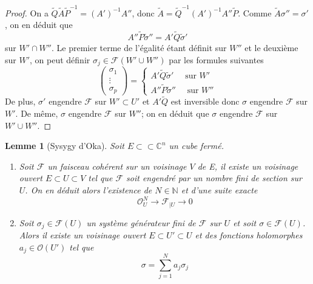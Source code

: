 \documentclass{article}
\newtheorem{lemme}[theoreme]{Lemme}
\theoremstyle{definition}
\theoremstyle{remark}
\begin{document}
\begin{proof}
On a $\tilde{Q}\tilde{A}\tilde{P}^{-1} = (A')^{-1}A''$, donc $\tilde{A} = \tilde{Q}^{-1}(A')^{-1}A''\tilde{P}$. Comme $\tilde{A}\sigma'' = \sigma'$, on en déduit que $$A''\tilde{P}\tilde{\sigma}''=A'\tilde{Q}\tilde{\sigma}'$$ sur $W' \cap W''$. Le premier terme de l'égalité étant définit sur $W''$ et le deuxième sur $W'$, on peut définir $\sigma_j \in \mathcal{F}(W'\cup W'')$ par les formules suivantes
\begin{equation*}
\begin{pmatrix}
   \sigma_1 \\ \vdots \\ \sigma_p
\end{pmatrix} = \left\{
\begin{array}{l}
  A'\tilde{Q}\tilde{\sigma}' \quad\text{ sur } W'\\
  A''\tilde{P}\tilde{\sigma}'' \quad\text{ sur } W''
\end{array}
\right.
\end{equation*}
De plus, $\sigma'$ engendre $\mathcal{F}$ sur $W' \subset U'$ et $A'\tilde{Q}$ est inversible donc $\sigma$ engendre $\mathcal{F}$ sur $W'$. De même, $\sigma$ engendre $\mathcal{F}$ sur $W''$; on en déduit que $\sigma$ engendre $\mathcal{F}$ sur $W'\cup W''$.
\end{proof}

\begin{lemme}[Sysygy d'Oka]
Soit $E \subset\subset \mathbb{C}^n$ un cube fermé.
\begin{enumerate}
\item Soit $\mathcal{F}$ un faisceau cohérent sur un voisinage $V$ de E, il existe un voisinage ouvert $E \subset U \subset V$ tel que $\mathcal{F}$ soit engendré par un nombre fini de section sur $U$. On en déduit alors l'existence de $N \in \mathbb{N}$ et d'une suite exacte $$\mathcal{O}^N_U \to \mathcal{F}_{|U} \to 0$$
\item Soit $\sigma_j \in \mathcal{F}(U)$ un système générateur fini de $\mathcal{F}$ sur $U$ et  soit $\sigma \in \mathcal{F}(U)$. Alors il existe un voisinage ouvert $E \subset U' \subset U$ et des fonctions holomorphes $a_j \in \mathcal{O}(U')$ tel que $$\sigma = \sum_{j=1}^N a_j\sigma_j$$
\end{enumerate}
\end{lemme}
\end{document}
